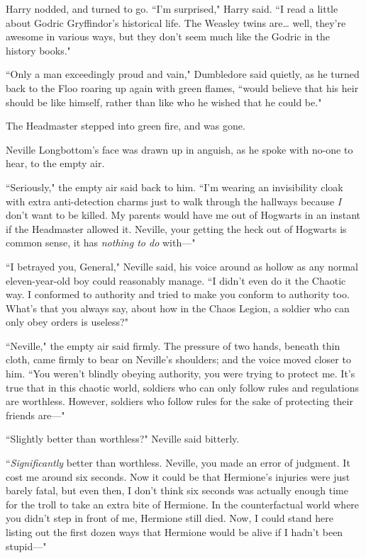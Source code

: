 Harry nodded, and turned to go. ``I'm surprised," Harry said. ``I read a little about Godric Gryffindor's historical life. The Weasley twins are{\ldots} well, they're awesome in various ways, but they don't seem much like the Godric in the history books."

``Only a man exceedingly proud and vain," Dumbledore said quietly, as he turned back to the Floo roaring up again with green flames, ``would believe that his heir should be like himself, rather than like who he wished that he could be."

The Headmaster stepped into green fire, and was gone.


Neville Longbottom's face was drawn up in anguish, as he spoke with no-one to hear, to the empty air.

``Seriously," the empty air said back to him. ``I'm wearing an invisibility cloak with extra anti-detection charms just to walk through the hallways because \emph{I} don't want to be killed. My parents would have me out of Hogwarts in an instant if the Headmaster allowed it. Neville, your getting the heck out of Hogwarts is common sense, it has \emph{nothing to do} with—"

``I betrayed you, General," Neville said, his voice around as hollow as any normal eleven-year-old boy could reasonably manage. ``I didn't even do it the Chaotic way. I conformed to authority and tried to make you conform to authority too. What's that you always say, about how in the Chaos Legion, a soldier who can only obey orders is useless?"

``Neville," the empty air said firmly. The pressure of two hands, beneath thin cloth, came firmly to bear on Neville's shoulders; and the voice moved closer to him. ``You weren't blindly obeying authority, you were trying to protect me. It's true that in this chaotic world, soldiers who can only follow rules and regulations are worthless. However, soldiers who follow rules for the sake of protecting their friends are—"

``Slightly better than worthless?" Neville said bitterly.

``\emph{Significantly} better than worthless. Neville, you made an error of judgment. It cost me around six seconds. Now it could be that Hermione's injuries were just barely fatal, but even then, I don't think six seconds was actually enough time for the troll to take an extra bite of Hermione. In the counterfactual world where you didn't step in front of me, Hermione still died. Now, I could stand here listing out the first dozen ways that Hermione would be alive if I hadn't been stupid—"

